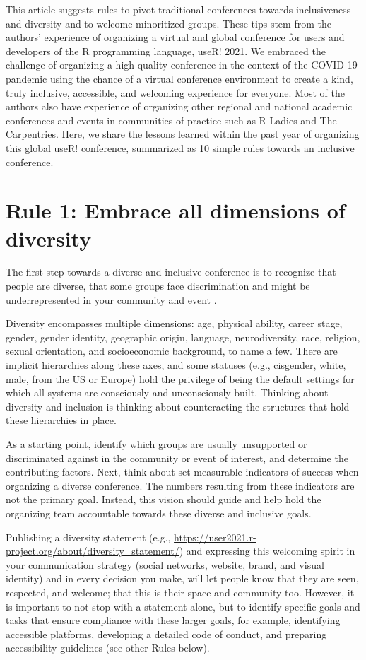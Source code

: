 \documentclass[10pt,letterpaper]{article}
\begin{document}
This article suggests rules to pivot traditional conferences towards inclusiveness and diversity and to welcome minoritized groups. These tips stem from the authors' experience of organizing a virtual and global conference for users and developers of the R programming language, useR! 2021. We embraced the challenge of organizing a high-quality conference in the context of the COVID-19 pandemic using the chance of a virtual conference environment to create a kind, truly inclusive, accessible, and welcoming experience for everyone. Most of the authors also have experience of  organizing other regional and national academic conferences and events in communities of practice such as R-Ladies and The Carpentries. Here, we share the lessons learned within the past year of organizing this global useR! conference, summarized as 10 simple rules towards an inclusive conference.

\section*{Rule 1: Embrace all dimensions of diversity}

The first step towards a diverse and inclusive conference is to recognize that people are diverse, that some groups face discrimination and might be underrepresented in your community and event \cite{timperley_he_2020}. 

Diversity encompasses multiple dimensions: age, physical ability, career stage, gender, gender identity,  geographic origin, language, neurodiversity, race, religion, sexual orientation, and socioeconomic background, to name a few. There are implicit hierarchies along these axes, and some statuses (e.g., cisgender, white, male, from the US or Europe) hold the privilege of being the default settings for which all systems are consciously and unconsciously built. Thinking about diversity and inclusion is thinking about counteracting the structures that hold these hierarchies in place.

As a starting point, identify which groups are usually unsupported or discriminated against in the community or event of interest, and determine the contributing factors. Next, think about set measurable indicators of success when organizing a diverse conference. The numbers resulting from these indicators are not the primary goal. Instead, this vision should guide and help hold the organizing team accountable towards these diverse and inclusive goals.

Publishing a diversity statement (e.g., \url{https://user2021.r-project.org/about/diversity_statement/}) and expressing this welcoming spirit in your communication strategy (social networks, website, brand, and visual identity) and in every decision you make, will let people know that they are seen, respected, and welcome; that this is their space and community too. However, it is important to not stop with a statement alone, but to identify specific goals and tasks that ensure compliance with these larger goals, for example, identifying accessible platforms, developing a detailed code of conduct, and preparing accessibility guidelines (see other Rules below).
\end{document}
